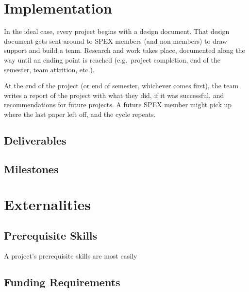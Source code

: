 \documentclass[conference]{IEEEtran} %
\begin{document}
\section{Implementation}
\label{sec:implementation}

In the ideal case, every project begins with a design document.
That design document gets sent around to SPEX members (and non-members) to draw support and build a team.
Research and work takes place, documented along the way until  an ending point is reached (e.g.\ project completion, end of the semester, team attrition, etc.).

At the end of the project (or end of semester, whichever comes first), the team writes a report of the project with what they did, if it was successful, and recommendations for future projects.
A future SPEX member might pick up where the last paper left off, and the cycle repeats.

\subsection{Deliverables}
\label{subsec:deliverables}

\subsection{Milestones}
\label{subsec:milestones}

\section{Externalities}

\subsection{Prerequisite Skills}
A project's prerequisite skills are most easily

\subsection{Funding Requirements}
\end{document}
